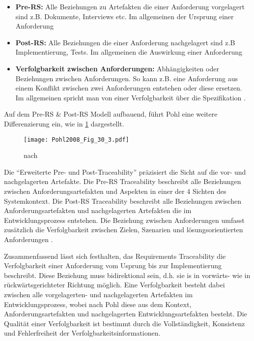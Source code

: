 \begin{itemize}
    \item \textbf{Pre-RS:} Alle Beziehungen zu Artefakten die einer Anforderung vorgelagert sind z.B. Dokumente, Interviews etc. Im allgemeinen der Ursprung einer Anforderung
    \item \textbf{Post-RS:} Alle Beziehungen die einer Anforderung nachgelagert sind z.B Implementierung, Tests. Im allgemeinen die Auswirkung einer Anforderung
    \item \textbf{Verfolgbarkeit zwischen Anforderungen:} Abhängigkeiten oder Beziehungen zwischen Anforderungen. So kann z.B. eine Anforderung aus einem Konflikt zwischen zwei Anforderungen entstehen oder diese ersetzen. Im allgemeinen spricht man von einer Verfolgbarkeit über die Spezifikation \cite{Pohl2015BasiswissenIREB-Standard}.
\end{itemize}

Auf dem Pre-RS \& Post-RS Modell aufbauend, führt Pohl eine weitere Differenzierung ein, wie in \ref{fig:abb2} dargestellt.

\begin{figure}[!htb]
  \centering
  \texttt{[image: Pohl2008\_Fig\_30\_3.pdf]}
  \caption{nach \cite[Fig. 30.3]{Pohl2008RequirementsTechniken}}
  \label{fig:abb2}
\end{figure}

Die \enquote{Erweiterte Pre- und Post-Traceability} präzisiert die Sicht auf die vor- und nachgelagerten Artefakte. Die Pre-RS Traceability beschreibt alle Beziehungen zwischen Anforderungsartefakten und Aspekten in einer der 4 Sichten des Systemkontext. Die Post-RS Traceability beschreibt alle Beziehungen zwischen Anforderungsartefakten und nachgelagerten Artefakten die im Entwicklungsprozess entstehen. Die Beziehung zwischen Anforderungen umfasst zusätzlich die Verfolgbarkeit zwischen Zielen, Szenarien und lösungsorientierten Anforderungen \cite{Pohl2008RequirementsTechniken}.

Zusammenfassend lässt sich festhalten, das Requirements Traceability die Verfolgbarkeit einer Anforderung vom Usprung bis zur Implementierung beschreibt. Diese Beziehung muss bidirektional sein, d.h. sie is in vorwärts- wie in rückwärtsgerichteter Richtung möglich. Eine Verfolgbarkeit besteht dabei zwischen alle vorgelagerten- und nachgelagerten Artefakten im Entwicklungsprozess, wobei nach Pohl diese aus dem Kontext, Anforderungsartefakten und nachgelagerten Entwicklungsartefakten besteht. Die Qualität einer Verfolgbarkeit ist bestimmt durch die Vollständigkeit, Konsistenz und Fehlerfreiheit der Verfolgbarkeitsinformationen.

